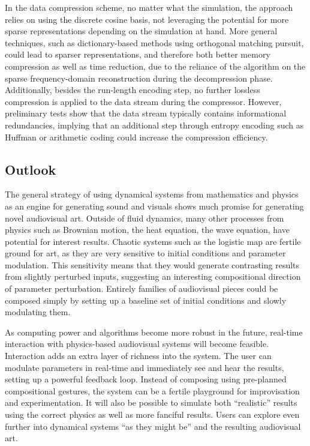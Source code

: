 In the data compression scheme, no matter what the simulation, the approach relies on using the discrete cosine basis, not leveraging the potential for more sparse representations depending
on the simulation at hand. More general techniques, such as dictionary-based methods using orthogonal matching pursuit, could lead to sparser representations, and therefore both better memory compression
as well as time reduction, due to the reliance of the algorithm on the sparse frequency-domain reconstruction during the decompression phase. Additionally, besides the run-length encoding step, no further
lossless compression is applied to the data stream during the compressor. However, preliminary tests show that the data stream typically contains informational redundancies, implying that an additional step through
entropy encoding such as Huffman or arithmetic coding could increase the compression efficiency.

\subsection{Outlook}
The general strategy of using dynamical systems from mathematics and physics as an engine for generating sound and visuals shows much promise for generating novel audiovisual art. Outside of fluid dynamics, many other processes from physics such as
Brownian motion, the heat equation, the wave equation, have potential for interest results. Chaotic systems such as the logistic map are fertile ground for art, as they are very sensitive to initial conditions and parameter modulation. This sensitivity means that they would generate contrasting results from slightly perturbed inputs, suggesting an interesting compositional direction of parameter perturbation. Entirely families of audiovisual pieces could be composed simply by setting up a baseline set of initial conditions and slowly modulating them.

As computing power and algorithms become more robust in the future, real-time interaction with physics-based audiovisual systems will become feasible. Interaction adds an extra layer of richness into the system. The user can modulate parameters in real-time and immediately see and hear the results, setting up a powerful feedback loop. Instead of composing using pre-planned compositional gestures, the system can be a fertile playground for improvisation and experimentation. It will also be possible to simulate both 	``realistic'' results using the correct physics as well as more fanciful results. Users can explore even further into dynamical systems ``as they might be'' and the resulting audiovisual art.


